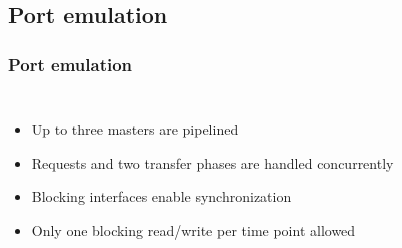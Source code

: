 \documentclass[]{beamer}
\begin{document}
      \subsection{Port emulation}        

         \begin{frame}
          \frametitle{Port emulation}
          \begin{columns}
              \begin{itemize}
               \item<1-> Up to three masters are pipelined
               \item<2-> Requests and two transfer phases are handled concurrently
               \item<3-> Blocking interfaces enable synchronization
               \item<4-> \alert{Only one blocking read/write per time point allowed}
              \end{itemize}

\end{columns}
\end{frame}
\end{document}
